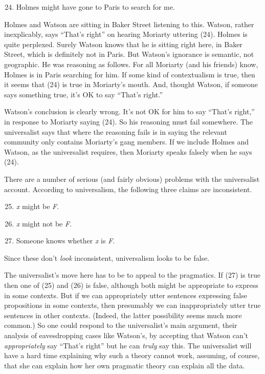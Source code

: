 \begin{enumerate}
\setcounter{enumi}{23} 
\item Holmes might have gone to Paris to search for me.
 \end{enumerate}

\noindent Holmes and Watson are sitting in Baker Street listening to this. Watson, rather inexplicably, says ``That's right'' on hearing Moriarty uttering (24). Holmes is quite perplexed. Surely Watson knows that he is sitting right here, in Baker Street, which is definitely not in Paris. But Watson's ignorance is semantic, not geographic. He was reasoning as follows. For all Moriarty (and his friends) know, Holmes is in Paris searching for him. If some kind of contextualism is true, then it seems that (24) is true in Moriarty's mouth. And, thought Watson, if someone says something true, it's OK to say ``That's right.''
 
Watson's conclusion is clearly wrong. It's not OK for him to say ``That's right,'' in response to Moriarty saying (24). So his reasoning must fail somewhere. The universalist says that where the reasoning fails is in saying the relevant community only contains Moriarty's gang members. If we include Holmes and Watson, as the universalist requires, then Moriarty speaks falsely when he says (24).
 
There are a number of serious (and fairly obvious) problems with the universalist account. According to universalism, the following three claims are inconsistent.
 
\begin{enumerate}
\setcounter{enumi}{24} 
\item \textit{x} might be \textit{F}.
\item \textit{x} might not be \textit{F}.
\item Someone knows whether \textit{x} is \textit{F}.
\end{enumerate}

\noindent Since these don't \textit{look} inconsistent, universalism looks to be false.
 
The universalist's move here has to be to appeal to the pragmatics. If (27) is true then one of (25) and (26) is false, although both might be appropriate to express in some contexts. But if we can appropriately utter sentences expressing false propositions in some contexts, then presumably we can inappropriately utter true sentences in other contexts. (Indeed, the latter possibility seems much more common.) So one could respond to the universalist's main argument, their analysis of eavesdropping cases like Watson's, by accepting that Watson can't \textit{appropriately} say ``That's right'' but he can \textit{truly} say this. The universalist will have a hard time explaining why such a theory cannot work, assuming, of course, that she 
can explain how her own pragmatic theory can explain all the data. 
 
